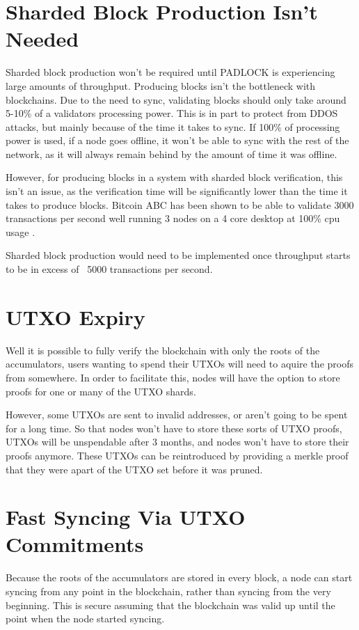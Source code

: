 \documentclass[12pt, letterpaper]{article}
\begin{document}
\section{Sharded Block Production Isn't Needed}
Sharded block production won't be required until PADLOCK is experiencing large
amounts of throughput. Producing blocks isn't the bottleneck with blockchains.
Due to the need to sync, validating blocks should only take around 5-10\% of a
validators processing power. This is in part to protect from DDOS attacks, but
mainly because of the time it takes to sync. If 100\% of processing power is
used, if a node goes offline, it won't be able to sync with the rest of the
network, as it will always remain behind by the amount of time it was offline.

However, for producing blocks in a system with sharded block verification, this
isn't an issue, as the verification time will be significantly lower than the
time it takes to produce blocks. Bitcoin ABC has been shown to be able to
validate 3000 transactions per second well running 3 nodes on a 4 core desktop
at 100\% cpu usage \cite{BitcoinBenchmark}.

Sharded block production would need to be implemented once throughput starts to
be in excess of ~5000 transactions per second.

\section{UTXO Expiry}
Well it is possible to fully verify the blockchain with only the roots of the
accumulators, users wanting to spend their UTXOs will need to aquire the proofs
from somewhere. In order to facilitate this, nodes will have the option to store
proofs for one or many of the UTXO shards.

However, some UTXOs are sent to invalid addresses, or aren't going to be spent
for a long time. So that nodes won't have to store these sorts of UTXO proofs,
UTXOs will be unspendable after 3 months, and nodes won't have to store their
proofs anymore. These UTXOs can be reintroduced by providing a merkle proof that
they were apart of the UTXO set before it was pruned.

\section{Fast Syncing Via UTXO Commitments}
Because the roots of the accumulators are stored in every block, a node can
start syncing from any point in the blockchain, rather than syncing from the
very beginning. This is secure assuming that the blockchain was valid up until
the point when the node started syncing.
\end{document}
